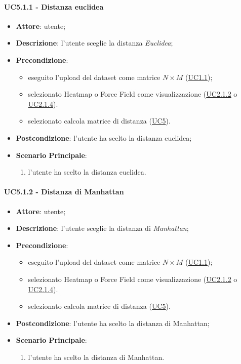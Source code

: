     \paragraph{UC5.1.1 - Distanza euclidea}
    \label{uc5.1.1}
    \begin{itemize}
    \item \textbf{Attore}: utente;
    \item \textbf{Descrizione}: l'utente sceglie la distanza \emph{Euclidea};
    \item \textbf{Precondizione}: 
    \begin{itemize}
        \item eseguito l'upload del dataset come matrice $N\times M$ (\hyperref[uc1.1]{UC1.1});
        \item selezionato Heatmap o Force Field come visualizzazione (\hyperref[uc2.1.2]{UC2.1.2} o \hyperref[uc2.1.4]{UC2.1.4}).
        \item selezionato calcola matrice di distanza (\hyperref[uc5]{UC5}).
    \end{itemize}  
    \item \textbf{Postcondizione}: l'utente ha scelto la distanza euclidea;
    \item \textbf{Scenario Principale}: 
    \begin{enumerate}
        \item l'utente ha scelto la distanza euclidea.
    \end{enumerate}
    \end{itemize}
    
    \paragraph{UC5.1.2 - Distanza di Manhattan}
    \label{uc5.1.2}
    \begin{itemize}
    \item \textbf{Attore}: utente;
    \item \textbf{Descrizione}: l'utente sceglie la distanza di \emph{Manhattan};
    \item \textbf{Precondizione}: 
    \begin{itemize}
        \item eseguito l'upload del dataset come matrice $N\times M$ (\hyperref[uc1.1]{UC1.1});
        \item selezionato Heatmap o Force Field come visualizzazione (\hyperref[uc2.1.2]{UC2.1.2} o \hyperref[uc2.1.4]{UC2.1.4}).
        \item selezionato calcola matrice di distanza (\hyperref[uc5]{UC5}).
    \end{itemize}  
    \item \textbf{Postcondizione}: l'utente ha scelto la distanza di Manhattan;
    \item \textbf{Scenario Principale}: 
    \begin{enumerate}
        \item l'utente ha scelto la distanza di Manhattan.
    \end{enumerate}
    \end{itemize}

